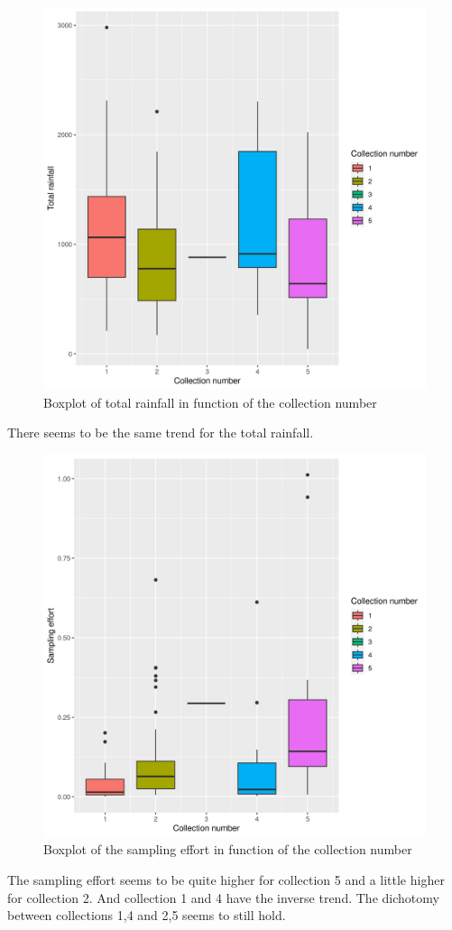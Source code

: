 \begin{figure}
\centering
\includegraphics{./img/5bbc4b4b07c0e990a3ae2755165958ffbf517902.png}
\caption{\label{fig:boxplot-total-rainfall}Boxplot of total rainfall in
function of the collection number}
\end{figure}

There seems to be the same trend for the total rainfall.

\begin{figure}
\centering
\includegraphics{./img/c75a33aa046b6f1bbcff45268346c4ec39067917.png}
\caption{\label{fig:boxplot-sampling-effort}Boxplot of the sampling
effort in function of the collection number}
\end{figure}

The sampling effort seems to be quite higher for collection 5 and a
little higher for collection 2. And collection 1 and 4 have the inverse
trend. The dichotomy between collections 1,4 and 2,5 seems to still
hold.
